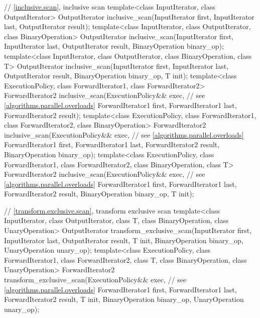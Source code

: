 \begin{codeblock}
{  // \ref{inclusive.scan}, inclusive scan
  template<class InputIterator, class OutputIterator>
    OutputIterator inclusive_scan(InputIterator first, InputIterator last,
                                  OutputIterator result);
  template<class InputIterator, class OutputIterator, class BinaryOperation>
    OutputIterator inclusive_scan(InputIterator first, InputIterator last,
                                  OutputIterator result,
                                  BinaryOperation binary_op);
  template<class InputIterator, class OutputIterator, class BinaryOperation, class T>
    OutputIterator inclusive_scan(InputIterator first, InputIterator last,
                                  OutputIterator result,
                                  BinaryOperation binary_op, T init);
  template<class ExecutionPolicy, class ForwardIterator1, class ForwardIterator2>
    ForwardIterator2 inclusive_scan(ExecutionPolicy&& exec, // see \ref{algorithms.parallel.overloads}
                                    ForwardIterator1 first, ForwardIterator1 last,
                                    ForwardIterator2 result);
  template<class ExecutionPolicy, class ForwardIterator1, class ForwardIterator2,
           class BinaryOperation>
    ForwardIterator2 inclusive_scan(ExecutionPolicy&& exec, // see \ref{algorithms.parallel.overloads}
                                    ForwardIterator1 first, ForwardIterator1 last,
                                    ForwardIterator2 result,
                                    BinaryOperation binary_op);
  template<class ExecutionPolicy, class ForwardIterator1, class ForwardIterator2,
           class BinaryOperation, class T>
    ForwardIterator2 inclusive_scan(ExecutionPolicy&& exec, // see \ref{algorithms.parallel.overloads}
                                    ForwardIterator1 first, ForwardIterator1 last,
                                    ForwardIterator2 result,
                                    BinaryOperation binary_op, T init);

  // \ref{transform.exclusive.scan}, transform exclusive scan
  template<class InputIterator, class OutputIterator, class T,
           class BinaryOperation, class UnaryOperation>
    OutputIterator transform_exclusive_scan(InputIterator first, InputIterator last,
                                            OutputIterator result,                                            
                                            T init,
                                            BinaryOperation binary_op,
                                            UnaryOperation unary_op);
  template<class ExecutionPolicy,
           class ForwardIterator1, class ForwardIterator2, class T,
           class BinaryOperation, class UnaryOperation>
    ForwardIterator2 transform_exclusive_scan(ExecutionPolicy&& exec, // see \ref{algorithms.parallel.overloads}
                                              ForwardIterator1 first, ForwardIterator1 last,
                                              ForwardIterator2 result,
                                              T init,
                                              BinaryOperation binary_op,
                                              UnaryOperation unary_op);

}
\end{codeblock}
